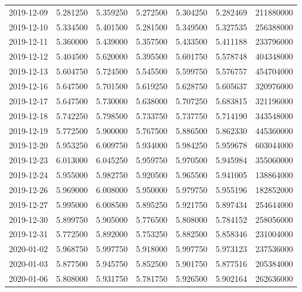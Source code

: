 \begin{tabular}{lrrrrrr}
2019-12-09 &    5.281250 &    5.359250 &    5.272500 &    5.304250 &    5.282469 &   211880000 \\
2019-12-10 &    5.334500 &    5.401500 &    5.281500 &    5.349500 &    5.327535 &   256388000 \\
2019-12-11 &    5.360000 &    5.439000 &    5.357500 &    5.433500 &    5.411188 &   233796000 \\
2019-12-12 &    5.404500 &    5.620000 &    5.395500 &    5.601750 &    5.578748 &   404348000 \\
2019-12-13 &    5.604750 &    5.724500 &    5.545500 &    5.599750 &    5.576757 &   454704000 \\
2019-12-16 &    5.647500 &    5.701500 &    5.619250 &    5.628750 &    5.605637 &   320976000 \\
2019-12-17 &    5.647500 &    5.730000 &    5.638000 &    5.707250 &    5.683815 &   321196000 \\
2019-12-18 &    5.742250 &    5.798500 &    5.733750 &    5.737750 &    5.714190 &   343548000 \\
2019-12-19 &    5.772500 &    5.900000 &    5.767500 &    5.886500 &    5.862330 &   445360000 \\
2019-12-20 &    5.953250 &    6.009750 &    5.934000 &    5.984250 &    5.959678 &   603044000 \\
2019-12-23 &    6.013000 &    6.045250 &    5.959750 &    5.970500 &    5.945984 &   355060000 \\
2019-12-24 &    5.955000 &    5.982750 &    5.920500 &    5.965500 &    5.941005 &   138864000 \\
2019-12-26 &    5.969000 &    6.008000 &    5.950000 &    5.979750 &    5.955196 &   182852000 \\
2019-12-27 &    5.995000 &    6.008500 &    5.895250 &    5.921750 &    5.897434 &   254644000 \\
2019-12-30 &    5.899750 &    5.905000 &    5.776500 &    5.808000 &    5.784152 &   258056000 \\
2019-12-31 &    5.772500 &    5.892000 &    5.753250 &    5.882500 &    5.858346 &   231004000 \\
2020-01-02 &    5.968750 &    5.997750 &    5.918000 &    5.997750 &    5.973123 &   237536000 \\
2020-01-03 &    5.877500 &    5.945750 &    5.852500 &    5.901750 &    5.877516 &   205384000 \\
2020-01-06 &    5.808000 &    5.931750 &    5.781750 &    5.926500 &    5.902164 &   262636000 \\

\end{tabular}
